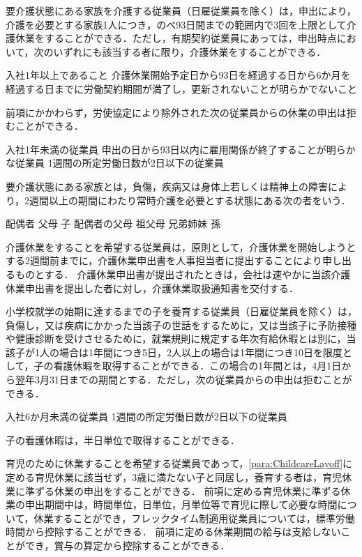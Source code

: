 \documentclass[11pt,a4paper]{jsarticle}
\begin{document}
要介護状態にある家族を介護する従業員（日雇従業員を除く）は，申出により，介護を必要とする家族1人につき，のべ93日間までの範囲内で3回を上限として介護休業をすることができる．ただし，有期契約従業員にあっては，申出時点において，次のいずれにも該当する者に限り，介護休業をすることができる．
\label{para:NursingLayoff}
\begin{enumerate}
	\itm 入社1年以上であること
	\itm 介護休業開始予定日から93日を経過する日から6か月を経過する日までに労働契約期間が満了し，更新されないことが明らかでないこと
\end{enumerate}
\term 前項にかかわらず，労使協定により除外された次の従業員からの休業の申出は拒むことができる．
\begin{enumerate}
	\itm 入社1年未満の従業員
	\itm 申出の日から93日以内に雇用関係が終了することが明らかな従業員
	\itm 1週間の所定労働日数が2日以下の従業員
\end{enumerate}
\term 要介護状態にある家族とは，負傷，疾病又は身体上若しくは精神上の障害により，2週間以上の期間にわたり常時介護を必要とする状態にある次の者をいう．
\begin{enumerate}
	\itm 配偶者
	\itm 父母
	\itm 子
	\itm 配偶者の父母
	\itm 祖父母
	\itm 兄弟姉妹
	\itm 孫
\end{enumerate}
\term 介護休業をすることを希望する従業員は，原則として，介護休業を開始しようとする2週間前までに，介護休業申出書を人事担当者に提出することにより申し出るものとする．
\term 介護休業申出書が提出されたときは，会社は速やかに当該介護休業申出書を提出した者に対し，介護休業取扱通知書を交付する．

小学校就学の始期に達するまでの子を養育する従業員（日雇従業員を除く）は，負傷し，又は疾病にかかった当該子の世話をするために，又は当該子に予防接種や健康診断を受けさせるために，就業規則に規定する年次有給休暇とは別に，当該子が1人の場合は1年間につき5日，2人以上の場合は1年間につき10日を限度として，子の看護休暇を取得することができる．この場合の1年間とは，4月1日から翌年3月31日までの期間とする．ただし，次の従業員からの申出は拒むことができる．
\label{para:ChildNursingAbsence}
\begin{enumerate}
	\itm 入社6か月未満の従業員
	\itm 1週間の所定労働日数が2日以下の従業員
\end{enumerate}
\term 子の看護休暇は，半日単位で取得することができる．

育児のために休業することを希望する従業員であって，\ref{para:ChildcareLayoff}に定める育児休業に該当せず，3歳に満たない子と同居し，養育する者は，育児休業に準ずる休業の申出をすることができる．
\term
前項に定める育児休業に準ずる休業の申出期間中は，時間単位，日単位，月単位等で育児に際して必要な時間について，休業することができ，フレックタイム制適用従業員については，標準労働時間から控除することができる．
\term
前項に定める休業期間の給与は支給しないことができ，賞与の算定から控除することができる．
\end{document}
